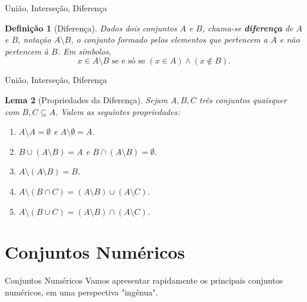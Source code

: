 \documentclass[10pt]{beamer}
\renewcommand{\indent}{\hspace*{2em}}
\theoremstyle{plain}
\newtheorem{defn}{Definição}[section]
\newtheorem{lem}[defn]{Lema}
\begin{document}
\begin{frame}{União, Interseção, Diferença}
\begin{defn}[Diferença]
 \vfill\indent Dados dois conjuntos $A$ e $B$, chama-se \textbf{diferença} de $A$ e $B$, notação $A\setminus B$, o conjunto formado pelos elementos que pertencem a $A$ e não pertencem à $B$. Em símbolos,
 $$x\in A\setminus B\mbox{ se e só se }(x\in A)\wedge(x\notin B).$$
\end{defn}
\end{frame}

\begin{frame}{União, Interseção, Diferença}
\begin{lem}[Propriedades da Diferença]
\vfill\indent Sejam $A,B,C$ três conjuntos quaisquer com $B,C\subseteq A$. Valem as seguintes propriedades:
\begin{enumerate}
    \item $A\setminus A=\emptyset$ e $A\setminus\emptyset=A$.
    \item $B\cup(A\setminus B)=A$ e $B\cap(A\setminus B)=\emptyset$.
    \item $A\setminus(A\setminus B)=B$.
    \item $A\setminus(B\cap C)=(A\setminus B)\cup(A\setminus C)$.
    \item $A\setminus(B\cup C)=(A\setminus B)\cap(A\setminus C)$.
\end{enumerate}
\end{lem}
\end{frame}

\section{Conjuntos Numéricos}

\begin{frame}{Conjuntos Numéricos}
 \indent Vamos apresentar rapidamente os principais conjuntos numéricos, em uma perspectiva "ingênua".
\end{frame}
\end{document}
